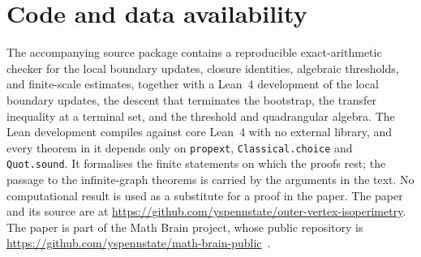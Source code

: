 \documentclass[11pt]{amsart}
\numberwithin{equation}{section}
\theoremstyle{definition}
\theoremstyle{remark}
\begin{document}
\section*{Code and data availability}
The accompanying source package contains a reproducible exact-arithmetic checker for the local boundary updates, closure identities, algebraic thresholds, and finite-scale estimates, together with a Lean~4 development of the local boundary updates, the descent that terminates the bootstrap, the transfer inequality at a terminal set, and the threshold and quadrangular algebra. The Lean development compiles against core Lean~4 with no external library, and every theorem in it depends only on \texttt{propext}, \texttt{Classical.choice} and \texttt{Quot.sound}. It formalises the finite statements on which the proofs rest; the passage to the infinite-graph theorems is carried by the arguments in the text. No computational result is used as a substitute for a proof in the paper. The paper and its source are at \url{https://github.com/yspennstate/outer-vertex-isoperimetry}. The paper is part of the Math Brain project, whose public repository is \url{https://github.com/yspennstate/math-brain-public}~\cite{MathBrainRepo}.
\end{document}
